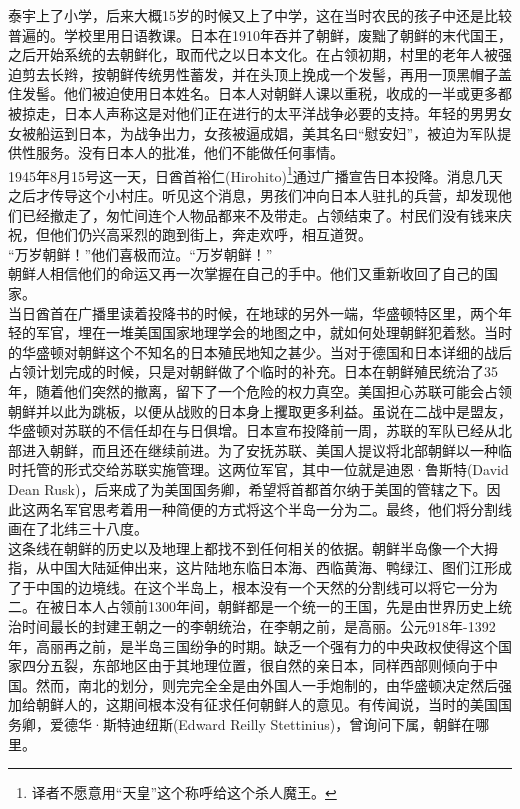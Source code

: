 泰宇上了小学，后来大概15岁的时候又上了中学，这在当时农民的孩子中还是比较普遍的。学校里用日语教课。日本在1910年吞并了朝鲜，废黜了朝鲜的末代国王，之后开始系统的去朝鲜化，取而代之以日本文化。在占领初期，村里的老年人被强迫剪去长辫，按朝鲜传统男性蓄发，并在头顶上挽成一个发髻，再用一顶黑帽子盖住发髻。他们被迫使用日本姓名。日本人对朝鲜人课以重税，收成的一半或更多都被掠走，日本人声称这是对他们正在进行的太平洋战争必要的支持。年轻的男男女女被船运到日本，为战争出力，女孩被逼成娼，美其名曰“慰安妇”，被迫为军队提供性服务。没有日本人的批准，他们不能做任何事情。\\

1945年8月15号这一天，日酋首裕仁(Hirohito)\footnote{译者不愿意用“天皇”这个称呼给这个杀人魔王。}通过广播宣告日本投降。消息几天之后才传导这个小村庄。听见这个消息，男孩们冲向日本人驻扎的兵营，却发现他们已经撤走了，匆忙间连个人物品都来不及带走。占领结束了。村民们没有钱来庆祝，但他们仍兴高采烈的跑到街上，奔走欢呼，相互道贺。\\

“万岁朝鲜！”他们喜极而泣。“万岁朝鲜！”\\

朝鲜人相信他们的命运又再一次掌握在自己的手中。他们又重新收回了自己的国家。\\

当日酋首在广播里读着投降书的时候，在地球的另外一端，华盛顿特区里，两个年轻的军官，埋在一堆美国国家地理学会的地图之中，就如何处理朝鲜犯着愁。当时的华盛顿对朝鲜这个不知名的日本殖民地知之甚少。当对于德国和日本详细的战后占领计划完成的时候，只是对朝鲜做了个临时的补充。日本在朝鲜殖民统治了35年，随着他们突然的撤离，留下了一个危险的权力真空。美国担心苏联可能会占领朝鲜并以此为跳板，以便从战败的日本身上攫取更多利益。虽说在二战中是盟友，华盛顿对苏联的不信任却在与日俱增。日本宣布投降前一周，苏联的军队已经从北部进入朝鲜，而且还在继续前进。为了安抚苏联、美国人提议将北部朝鲜以一种临时托管的形式交给苏联实施管理。这两位军官，其中一位就是迪恩·鲁斯特(David Dean Rusk)，后来成了为美国国务卿，希望将首都首尔纳于美国的管辖之下。因此这两名军官思考着用一种简便的方式将这个半岛一分为二。最终，他们将分割线画在了北纬三十八度。\\

这条线在朝鲜的历史以及地理上都找不到任何相关的依据。朝鲜半岛像一个大拇指，从中国大陆延伸出来，这片陆地东临日本海、西临黄海、鸭绿江、图们江形成了于中国的边境线。在这个半岛上，根本没有一个天然的分割线可以将它一分为二。在被日本人占领前1300年间，朝鲜都是一个统一的王国，先是由世界历史上统治时间最长的封建王朝之一的李朝统治，在李朝之前，是高丽。公元918年-1392年，高丽再之前，是半岛三国纷争的时期。缺乏一个强有力的中央政权使得这个国家四分五裂，东部地区由于其地理位置，很自然的亲日本，同样西部则倾向于中国。然而，南北的划分，则完完全全是由外国人一手炮制的，由华盛顿决定然后强加给朝鲜人的，这期间根本没有征求任何朝鲜人的意见。有传闻说，当时的美国国务卿，爱德华·斯特迪纽斯(Edward Reilly Stettinius)，曾询问下属，朝鲜在哪里。\\

